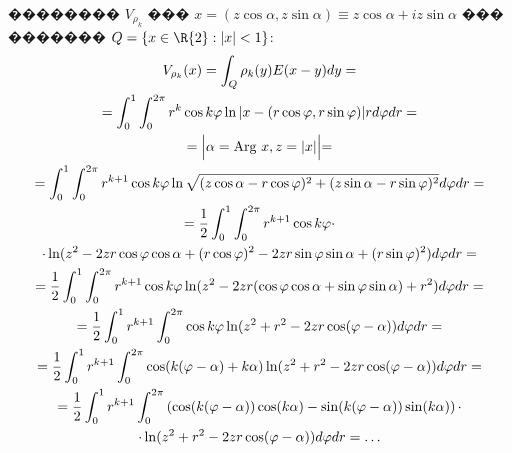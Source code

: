 \documentclass[a4paper]{article}
\begin{document}
  �������� $V_{\rho_k}$ ��� $x=(z \cos\alpha,z \sin \alpha) \equiv z \cos\alpha + i z \sin \alpha$ ��� ������� $Q= \{x \in \R{2}: |x|<1 \}$:
\begin{multline}
  V_{\rho_k}(x)= \int_Q \rho_k(y) E(x-y) dy= \\
  =\int_0^1 \int_0^{2 \pi} r^k \cos k\varphi \ln |x-(r \cos \varphi, r \sin\varphi)| r d\varphi dr =\\
  =\Bigl|\alpha = \text{Arg}\ x, z=|x| \Bigl|=\\
  =\int_0^1 \int_0^{2 \pi} r^{k+1} \cos k\varphi \ln \sqrt{(z\cos \alpha-r \cos \varphi)^2+(z\sin \alpha-r \sin\varphi)^2} d\varphi dr=\\
  =\frac{1}{2} \int_0^1 \int_0^{2 \pi} r^{k+1} \cos k\varphi \cdot \\
  \cdot \ln(z^2 - 2z r \cos\varphi \cos \alpha +(r \cos \varphi)^2 - 2z r \sin \varphi \sin \alpha +(r \sin \varphi)^2) d\varphi dr =\\
  =\frac{1}{2} \int_0^1 \int_0^{2 \pi} r^{k+1} \cos k\varphi \ln(z^2-2zr(\cos \varphi \cos \alpha + \sin \varphi \sin \alpha)+r^{2})d\varphi dr=\\
  =\frac{1}{2} \int_0^1 r^{k+1}\int_0^{2 \pi}  \cos k\varphi \ln(z^2 + r^{2} - 2zr \cos (\varphi -\alpha)) d\varphi dr=\\
  =\frac{1}{2} \int_0^1 r^{k+1}\int_0^{2 \pi}\cos (k(\varphi -\alpha)+k\alpha)\ln(z^2 + r^{2} - 2zr \cos (\varphi -\alpha)) d\varphi dr= \\
  =\frac{1}{2} \int_0^1 r^{k+1}\int_0^{2 \pi}\left(\cos (k(\varphi -\alpha)) \cos(k\alpha) - \sin (k(\varphi -\alpha)) \sin(k\alpha)\right) \cdot \\
  \cdot \ln(z^2 + r^{2} - 2zr \cos (\varphi -\alpha)) d\varphi dr=\dots
\end{multline}
\end{document}

